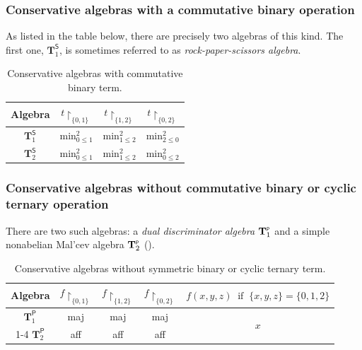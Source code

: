 \documentclass[11pt]{amsart}
\newcommand{\m}[1]{\mathbf{\uppercase{#1}}}
\theoremstyle{definition}
\theoremstyle{remark}
\theoremstyle{plain}
\def\T{\mathbf{T}}
\begin{document}
\subsubsection*{Conservative algebras with a commutative binary operation }
    As listed in the table below, there are precisely two algebras of this kind. The first one, $\T^{\scriptscriptstyle{\mathsf{S}}}_1$, is sometimes referred to as \emph{rock-paper-scissors algebra}.
\begin{table}[!ht]
\centering
 \begin{tabular}{|c||c|c|c|}
\hline
    Algebra & $t{\restriction_{\{0,1\}}}$ & $t{\restriction_{\{1,2\}}}$ & $t{\restriction_{\{0,2\}}}$ \\
\hline\hline
     $\T^{\scriptscriptstyle{\mathsf{S}}}_1$  & $\text{min}^2_{0\leqslant 1}$ & $\text{min}^2_{1\leqslant 2}$ & $\text{min}^2_{2\leqslant 0}$ \\
\hline
    $\T^{\scriptscriptstyle{\mathsf{S}}}_2$  & $\text{min}^2_{0\leqslant 1}$ & $\text{min}^2_{1\leqslant 2}$ & $\text{min}^2_{0\leqslant 2}$ \\
 \hline
\end{tabular}  
\caption{Conservative algebras with commutative binary term.}
\label{table:2}
\end{table}
\FloatBarrier

\subsubsection*{Conservative algebras without commutative binary or cyclic ternary operation}
There are two such algebras: a \emph{dual discriminator algebra} $\m t_1^{\scriptscriptstyle{\mathsf{P}}}$ and a simple nonabelian Mal'cev algebra $\m t_2^{\scriptscriptstyle{\mathsf{P}}}$ (). 

\begin{table}[hbt!]
\centering
\begin{tabular}{|c||c|c|c|c|}
\hline
    Algebra & $f{\restriction_{\{0,1\}}}$ & $f{\restriction_{\{1,2\}}}$ & $f{\restriction_{\{0,2\}}}$ & $f(x,y,z)\:\text{ if }\: \{x,y,z\}=\{0,1,2\}$ \\
\hline\hline
     $\T^{\scriptscriptstyle{\mathsf{P}}}_1$  & maj & maj & maj & \multirow{2}{*}{$x$}\\

\cline{1-4}
    $\T^{\scriptscriptstyle{\mathsf{P}}}_2$  & aff & aff & aff & \\
 \hline
\end{tabular}  
\caption{Conservative algebras without symmetric binary or cyclic ternary term.}
\label{table:3}
\end{table}
\end{document}
